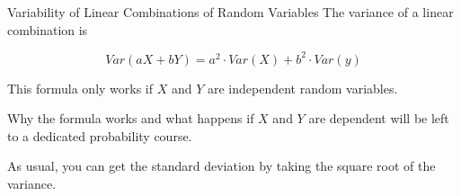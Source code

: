 \documentclass{beamer}
\begin{document}
\begin{frame}
\begin{block}{Variability of Linear Combinations of Random Variables}
The variance of a linear combination is

\vspace{-3mm}
\begin{equation*}
Var(aX+bY) = a^2\cdot Var(X) + b^2\cdot Var(y)
\end{equation*}
\end{block}\pause

\begin{note}
This formula only works if $X$ and $Y$ are independent random variables.
\end{note}\pause

\begin{note}
Why the formula works and what happens if $X$ and $Y$ are dependent will be left to a dedicated probability course.
\end{note}\pause

\begin{note}
As usual, you can get the standard deviation by taking the square root of the variance.
\end{note}
\end{frame}
\end{document}
